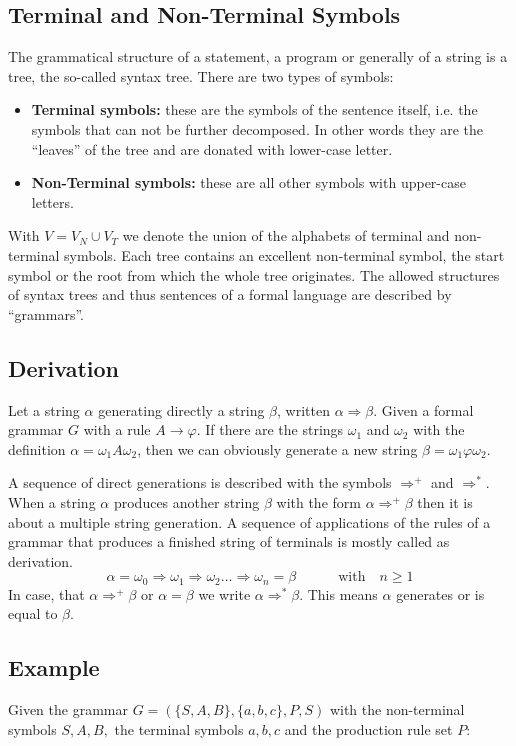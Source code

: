 \subsection{Terminal and Non-Terminal Symbols}
The grammatical structure of a statement, a program or generally of a string is a tree, the so-called syntax tree. There are two types of symbols:
\begin{itemize}
\item \textbf{Terminal symbols: }these are the symbols of the sentence itself, i.e. the symbols that can not be further decomposed. In other words they are the ``leaves'' of the tree and are donated with lower-case letter. 
\item \textbf{Non-Terminal symbols: }these are all other symbols with upper-case letters.
\end{itemize}
With $V=V_N \cup V_T$ we denote the union of the alphabets of terminal and non-terminal symbols.
Each tree contains an excellent non-terminal symbol, the start symbol or the root from which the whole tree originates. The allowed structures of syntax trees and thus sentences of a formal language are described by ``grammars''.

\subsection{Derivation}
Let a string $\alpha$ generating directly a string $\beta$, written $\alpha \Rightarrow \beta$. Given a formal grammar $G$ with a rule $A \rightarrow \varphi$. If there are the strings $\omega_1$ and $\omega_2$ with the definition $\alpha = \omega_1A\omega_2$, then we can obviously generate a new string $\beta = \omega_1\varphi\omega_2$.
 
A sequence of direct generations is described with the symbols $\Rightarrow^+$ and $\Rightarrow^*$. When a string $\alpha$ produces another string $\beta$ with the form $\alpha \Rightarrow^+ \beta$ then it is about a multiple string generation. A sequence of applications of the rules of a grammar that produces a finished string of terminals is mostly called as derivation. 
$$\alpha = \omega_0 \Rightarrow \omega_1 \Rightarrow \omega_2 \ldots \Rightarrow \omega_n = \beta \qquad \quad \textrm{with} \quad n \geq 1$$ 
In case, that $\alpha \Rightarrow^+ \beta$ or $\alpha = \beta$ we write $\alpha \Rightarrow^* \beta$. This means $\alpha$ generates or is equal to $\beta$.

\subsection{Example}
Given the grammar $G = (\{S,A,B\},\{a,b,c\},P,S)$ with the non-terminal symbols $S,A,B,$ the terminal symbols $a,b,c$ and the production rule set $P$:

